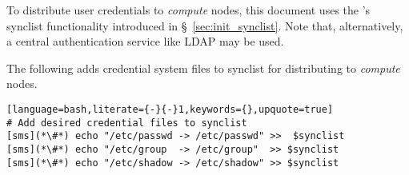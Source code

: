 To distribute user credentials to {\em compute} nodes, this document uses the
\xCAT's synclist functionality introduced in \S~\ref{sec:init_synclist}.  Note that,
alternatively, a central authentication service like LDAP may be used.  

The following adds credential system files to synclist for distributing to {\em
compute} nodes. 

\begin{lstlisting}[language=bash,literate={-}{-}1,keywords={},upquote=true]
# Add desired credential files to synclist
[sms](*\#*) echo "/etc/passwd -> /etc/passwd" >>  $synclist
[sms](*\#*) echo "/etc/group  -> /etc/group"  >> $synclist
[sms](*\#*) echo "/etc/shadow -> /etc/shadow" >> $synclist
\end{lstlisting}

